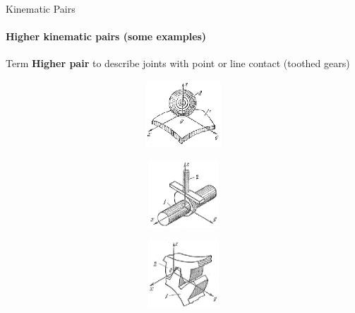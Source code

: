 \documentclass[aspectratio=169]{beamer}
\begin{document}
\begin{frame}[t]{Kinematic Pairs}
    \framesubtitle{Higher kinematic pairs (some examples)}
    \vspace{-0.3cm}
    Term \textbf{Higher pair} to describe joints with point or line contact (toothed gears)
    \vspace{-0.3cm}

    \begin{figure}[H]
        \begin{subfigure}{0.32\textwidth}
            \centering\includegraphics[height=2.5cm,width=1\textwidth,keepaspectratio]{hkp_1.png}
            \label{fig:hkp_1.png}
        \end{subfigure}
        \begin{subfigure}{0.32\textwidth}
            \centering\includegraphics[height=2.5cm,width=1\textwidth,keepaspectratio]{hkp_2.png}
            \label{fig:hkp_2.png}
        \end{subfigure}
        \begin{subfigure}{0.32\textwidth}
            \centering\includegraphics[height=2.5cm,width=1\textwidth,keepaspectratio]{hkp_3.png}
            \label{fig:hkp_3.png}
        \end{subfigure}


\end{figure}
\end{frame}
\end{document}
